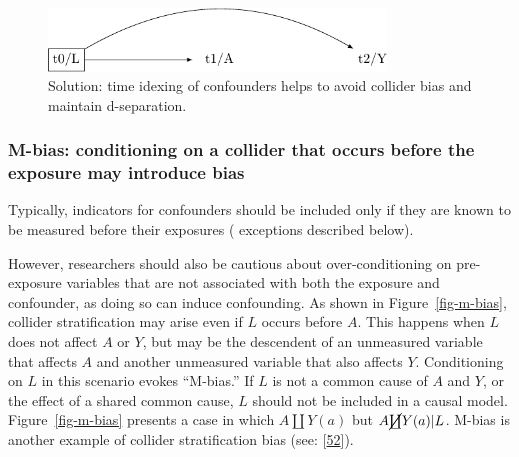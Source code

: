 \documentclass[
  singlecolumn]{article}
\begin{document}
\begin{figure}

{\centering \includegraphics[width=0.8\textwidth,height=\textheight]{causal-dags_files/figure-pdf/fig-dag-common-effect-solution-1.pdf}

}

\caption{\label{fig-dag-common-effect-solution}Solution: time idexing of
confounders helps to avoid collider bias and maintain d-separation.}

\end{figure}

\hypertarget{m-bias-conditioning-on-a-collider-that-occurs-before-the-exposure-may-introduce-bias}{%
\subsubsection{M-bias: conditioning on a collider that occurs before the
exposure may introduce
bias}\label{m-bias-conditioning-on-a-collider-that-occurs-before-the-exposure-may-introduce-bias}}

Typically, indicators for confounders should be included only if they
are known to be measured before their exposures ( exceptions described
below).

However, researchers should also be cautious about over-conditioning on
pre-exposure variables that are not associated with both the exposure
and confounder, as doing so can induce confounding. As shown in
Figure~\ref{fig-m-bias}, collider stratification may arise even if \(L\)
occurs before \(A\). This happens when \(L\) does not affect \(A\) or
\(Y\), but may be the descendent of an unmeasured variable that affects
\(A\) and another unmeasured variable that also affects \(Y\).
Conditioning on \(L\) in this scenario evokes ``M-bias.'' If \(L\) is
not a common cause of \(A\) and \(Y\), or the effect of a shared common
cause, \(L\) should not be included in a causal model.
Figure~\ref{fig-m-bias} presents a case in which \(A \coprod Y(a)\) but
\(A \cancel{\coprod} Y(a)| L\). M-bias is another example of collider
stratification bias (see: {[}\protect\hyperlink{ref-cole2010}{52}{]}).
\end{document}
